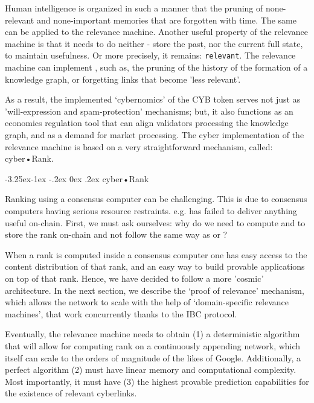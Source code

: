 \documentclass[8pt,oneside]{amsart}
\makeatletter
\newcommand{\linkgreen}[2]{\href{#1}{\color{green}{#2}}}
\renewcommand\subsection{\@startsection{subsection}{2}{\z@}%
                                     {-3.25ex\@plus -1ex \@minus -.2ex}%
                                     {0ex \@plus .2ex}%
                                     {\play\Large}}%
\newcommand{\titleSection}[1]{\subsection{#1}}
\newcommand{\code}[1]{{\PlayBold #1}}
\makeatother
\begin{document}
\begin{Abstract}
Human intelligence is organized in such a manner that the pruning of none-relevant and none-important memories that are forgotten with time. The same can be applied to the relevance machine. Another useful property of the relevance machine is that it needs to do neither - store the past, nor the current full state, to maintain usefulness. Or more precisely, it remains: \verb|relevant|. The relevance machine can implement \linkgreen{https://ipfs.io/ipfs/QmP81EcuNDZHQutvdcDjbQEqiTYUzU315aYaTyrVj6gtJb}{aggressive pruning strategies}, such as, the pruning of the history of the formation of a knowledge graph, or forgetting links that become 'less relevant'.

As a result, the implemented ‘cybernomics’ of the CYB token serves not just as 'will-expression and spam-protection' mechanisms; but, it also functions as an economics regulation tool that can align validators processing the knowledge graph, and as a demand for market processing. The \code{cyber} implementation of the relevance machine is based on a very straightforward mechanism, called: cyber•Rank.

\titleSection{cyber•Rank}\label{cyberRank}

Ranking using a consensus computer can be challenging. This is due to consensus computers having serious resource restraints. e.g. \linkgreen{https://ipfs.io/ipfs/QmWTZjDZNbBqcJ5b6VhWGXBQ5EQavKKDteHsdoYqB5CBjh}{Nebulas} has failed to deliver anything useful on-chain. First, we must ask ourselves: why do we need to compute and to store the rank on-chain and not follow the same way as \linkgreen{https://ipfs.io/ipfs/QmZo7eY5UdJYotf3Z9GNVBGLjkCnE1j2fMdW2PgGCmvGPj}{Colony} or \linkgreen{https://ipfs.io/ipfs/QmTrxXp2xhB2zWGxhNoLgsztevqKLwpy5HwKjLjzFa7rnD}{Truebit}?

When a rank is computed inside a consensus computer one has easy access to the content distribution of that rank, and an easy way to build provable applications on top of that rank. Hence, we have decided to follow a more 'cosmic' architecture. In the next section, we describe the ‘proof of relevance’ mechanism, which allows the network to scale with the help of ‘domain-specific relevance machines’, that work concurrently thanks to the IBC protocol.

Eventually, the relevance machine needs to obtain (1) a deterministic algorithm that will allow for computing rank on a continuously appending network, which itself can scale to the orders of magnitude of the likes of Google. Additionally, a perfect algorithm (2) must have linear memory and computational complexity. Most importantly, it must have (3) the highest provable prediction capabilities for the existence of relevant cyberlinks.


\end{Abstract}
\end{document}

